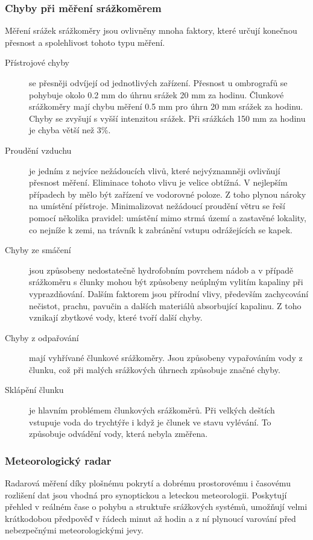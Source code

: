 \documentclass[a4paper,12pt]{article}
\begin{document}
\subsubsection*{Chyby při měření srážkoměrem} 
Měření srážek srážkoměry jsou ovlivněny mnoha faktory, které určují konečnou přesnost a spolehlivost tohoto typu měření.
\begin{description} 
\item[Přístrojové chyby] se přesněji odvíjejí od jednotlivých zařízení. Přesnost u ombrografů se pohybuje okolo 0.2 mm do úhrnu srážek 20 mm za hodinu. Člunkové srážkoměry mají chybu měření 0.5 mm pro úhrn 20 mm srážek za hodinu. Chyby se zvyšují s vyšší intenzitou srážek. Při srážkách 150 mm za hodinu je chyba větší než 3\%. \cite{wmo}
\item[Proudění vzduchu] je jedním z nejvíce nežádoucích vlivů, které nejvýznamněji ovlivňují přesnost měření. Eliminace tohoto vlivu je velice obtížná. V nejlepším případech by mělo být zařízení ve vodorovné poloze. Z toho plynou nároky na umístění přístroje. Minimalizovat nežádoucí proudění větru se řeší pomocí několika pravidel: umístění mimo strmá území a zastavěné lokality, co nejníže k zemi, na trávník k zabránění vstupu odrážejících se kapek. 
\item[Chyby ze smáčení] jsou způsobeny nedostatečně hydrofobním povrchem nádob a v případě srážkoměru s člunky mohou být způsobeny neúplným vylitím kapaliny při vyprazdňování. Dalším faktorem jsou přírodní vlivy, především zachycování nečistot, prachu, pavučin a dalších materiálů absorbující kapalinu. Z toho vznikají zbytkové vody, které tvoří další chyby. 
\item[Chyby z odpařování] mají vyhřívané člunkové srážkoměry. Jsou způsobeny vypařováním vody z člunku, což při malých srážkových úhrnech způsobuje značné chyby.
\item[Sklápění člunku] je hlavním problémem člunkových srážkoměrů. Při velkých deštích vstupuje voda do trychtýře i když je člunek ve stavu vylévání. To způsobuje odvádění vody, která nebyla změřena. 

\end{description}

\subsubsection{Meteorologický radar}
Radarová měření díky plošnému pokrytí a dobrému prostorovému i časovému rozlišení dat jsou vhodná pro synoptickou a leteckou meteorologii. Poskytují přehled v reálném čase o pohybu a struktuře srážkových systémů, umožňují velmi krátkodobou předpověď v řádech minut až hodin a z ní plynoucí varování před nebezpečnými meteorologickými jevy.\cite{radar_chmu}
\end{document}
